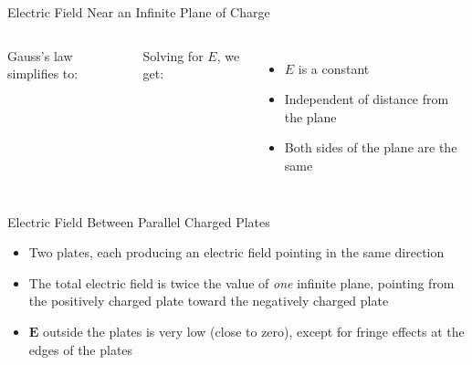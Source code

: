 \documentclass[12pt,aspectratio=169]{beamer}
\begin{document}
\begin{frame}{Electric Field Near an Infinite Plane of Charge}
  \begin{columns}

    Gauss's law simplifies to:
    

    \vspace{-.1in}Solving for $E$, we get:

    \begin{itemize}
    \item $E$ is a constant
    \item Independent of distance from the plane
    \item Both sides of the plane are the same
    \end{itemize}
  \end{columns}
\end{frame}



\begin{frame}{Electric Field Between Parallel Charged Plates}
  \begin{center}
  \end{center}
  \begin{itemize}
  \item Two plates, each producing an electric field pointing in
    the same direction
  \item The total electric field is twice the value of \emph{one} infinite
    plane, pointing from the positively charged plate toward the negatively
    charged plate

  \item $\bm{E}$ outside the plates is very low (close to zero), except for
    fringe effects at the edges of the plates
  \end{itemize}
\end{frame}
\end{document}
